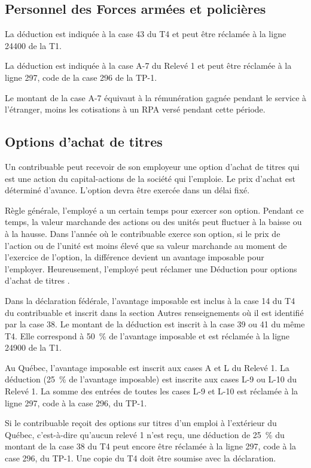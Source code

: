 \subsection{Personnel des Forces armées et policières}
La déduction est indiquée à la case 43 du T4 et peut être réclamée à la ligne 24400 de la T1.

La déduction est indiquée à la case A-7 du Relevé 1 et peut être réclamée à la ligne 297, code  \fg{} de la case 296 de la TP-1.

Le montant de la case A-7 équivaut à la rémunération gagnée pendant le service à l'étranger, moins les cotisations à un RPA versé pendant cette période.


\subsection{Options d'achat de titres}
Un contribuable peut recevoir de son employeur une option d'achat de titres qui est une action du capital-actions de la société qui l'emploie. Le prix d'achat est déterminé d'avance. L'option devra être exercée dans un délai fixé.

Règle générale, l'employé a un certain temps pour exercer son option. Pendant ce temps, la valeur marchande des actions ou des unités peut fluctuer à la baisse ou à la hausse. Dans l'année où le contribuable exerce son option, si le prix de l'action ou de l'unité est moins élevé que sa valeur marchande au moment de l'exercice de l'option, la différence devient un avantage imposable pour l'employer. Heureusement, l'employé peut réclamer une \og Déduction pour options d'achat de titres \fg{}.

Dans la déclaration fédérale, l'avantage imposable est inclus à la case 14 du T4 du contribuable et inscrit dans la section \og Autres renseignements \fg{} où il est identifié par la case 38. Le montant de la déduction est inscrit à la case 39 ou 41 du même T4. Elle correspond à 50~\% de l'avantage imposable et est réclamée à la ligne 24900 de la T1.

Au Québec, l'avantage imposable est inscrit aux cases A et L du Relevé 1. La déduction (25~\% de l'avantage imposable) est inscrite aux cases L-9 ou L-10 du Relevé 1. La somme des entrées de toutes les cases L-9 et L-10 est réclamée à la ligne 297, code  \fg{} à la case 296, du TP-1.

Si le contribuable reçoit des options sur titres d'un emploi à l'extérieur du Québec, c'est-à-dire qu'aucun relevé 1 n'est reçu, une déduction de 25~\% du montant de la case 38 du T4 peut encore être réclamée à la ligne 297, code  \fg{} à la case 296, du TP-1. Une copie du T4 doit être soumise avec la déclaration.


